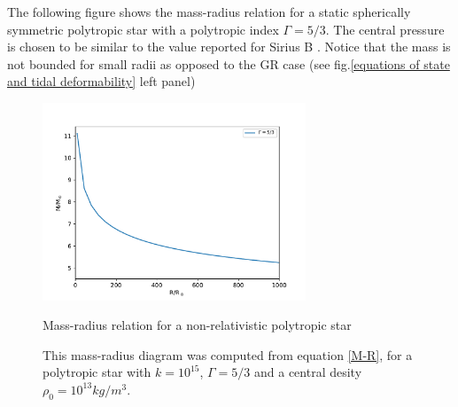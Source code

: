 The following figure shows the mass-radius relation for a static spherically symmetric polytropic star with a polytropic index $\Gamma=5/3$. The central pressure is chosen to be similar to the value reported for Sirius B \cite{Holberg_1998}. Notice that the mass is not bounded for small radii as opposed to the GR case (see fig.\ref{equations of state and tidal deformability} left panel)



\begin{figure}[hbt!]
\begin{center}
\includegraphics[width=0.7\textwidth, angle=0]{images/polytrope_own.pdf}
\captionsetup{width=.8\textwidth}
\caption{Mass-radius relation for a non-relativistic polytropic star}
\caption*{This mass-radius diagram was computed from equation \ref{M-R}, for a polytropic star with $k=10^{15}$, $\Gamma=5/3$ and a central desity $\rho_0=10^{13}kg/m^3$.}
\label{polytropes1}
\end{center}
\end{figure}

\FloatBarrier

